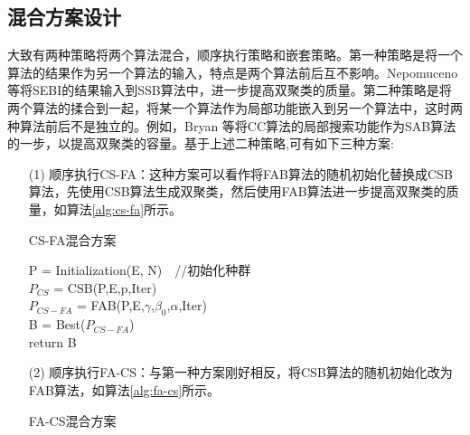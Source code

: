     \subsection{混合方案设计}\label{sec:three}
    大致有两种策略将两个算法混合，顺序执行策略和嵌套策略。第一种策略是将一个算法的结果作为另一个算法的输入，特点是两个算法前后互不影响。Nepomuceno 等将SEBI的结果输入到SSB算法中，进一步提高双聚类的质量。第二种策略是将两个算法的揉合到一起，将某一个算法作为局部功能嵌入到另一个算法中，这时两种算法前后不是独立的。例如，Bryan 等将CC算法的局部搜索功能作为SAB算法的一步，以提高双聚类的容量。基于上述二种策略,可有如下三种方案:
    \begin{enumerate}
       \item[(1)] 顺序执行CS-FA：这种方案可以看作将FAB算法的随机初始化替换成CSB算法，先使用CSB算法生成双聚类，然后使用FAB算法进一步提高双聚类的质量，如算法\ref{alg:cs-fa}所示。
        \begin{algorithm}[htbp]
        \caption{CS-FA混合方案} \label{alg:cs-fa}
        P = Initialization(E, N)　//初始化种群 \\
        $P_{CS}$ = CSB(P,E,p,Iter) \\
        $P_{CS-FA}$ = FAB(P,E,$\gamma$,$\beta_0$,$\alpha$,Iter) \\
        B = Best($P_{CS-FA}$) \\
        return B
        \end{algorithm}

       \item[(2)] 顺序执行FA-CS：与第一种方案刚好相反，将CSB算法的随机初始化改为FAB算法，如算法\ref{alg:fa-cs}所示。
        \begin{algorithm}[htbp]
        \caption{FA-CS混合方案}\label{alg:fa-cs}


\end{algorithm}
\end{enumerate}
